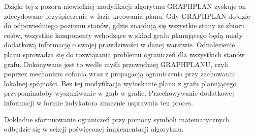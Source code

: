     Dzięki tej z pozoru niewielkiej modyfikacji algorytmu GRAPHPLAN zyskuje on zdecydowane przyśpieszenie w fazie kreowania planu. Gdy GRAPHPLAN dojdzie do odpowiedniego
    poziomu stanów, gdzie znajdują się wszystkie stany ze zbioru celów, wszystkie komponenty wchodzące w skład grafu planującego będą miały dodatkową informację o swojej prawdziwości 
    w danej warstwie. Odnalezienie planu sprowadza się do rozwiązania problemu ograniczeń dla wszystkich stanów grafu. Dokonywane jest to wedle myśli przewodniej GRAPHPLANU, czyli 
    poprzez mechanizm cofania wraz z propagacją ograniczenia przy zachowaniu lokalnej spójności. Bez tej modyfikacja wyłuskanie planu z grafu planującego przypominałoby wyszukiwanie 
    w głąb w grafie. Przechowywanie dodatkowej informacji w formie indykatora znacznie usprawnia ten proces.

    Dokładne sformuowanie ograniczeń przy pomocy symboli matematycznych odbędzie się w sekcji poświęconej implementacji algorytmu.
    